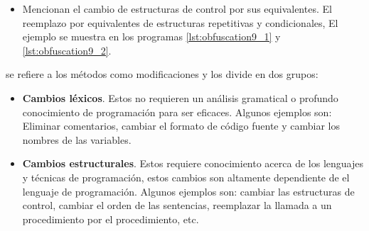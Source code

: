 \begin{itemize}
    \item \cite{article3} Mencionan el cambio de estructuras de control por sus equivalentes. El reemplazo por equivalentes de estructuras repetitivas y condicionales, El ejemplo se muestra en los programas \ref{lst:obfuscation9_1} y \ref{lst:obfuscation9_2}.
    
    
\end{itemize}

\cite{Bejarano2015} se refiere a los métodos como modificaciones y los divide en dos grupos:
\begin{itemize}
  \item \textbf{Cambios léxicos}. Estos no requieren un análisis gramatical o profundo conocimiento de programación para ser eficaces. Algunos ejemplos son: Eliminar comentarios, cambiar el formato de código fuente y cambiar los nombres de las variables.
  \item \textbf{Cambios estructurales}. Estos requiere conocimiento acerca de los lenguajes y técnicas de programación, estos cambios son altamente dependiente de el lenguaje de programación. Algunos ejemplos son: cambiar las estructuras de control, cambiar el orden de las sentencias, reemplazar la llamada a un procedimiento por el procedimiento, etc.
\end{itemize}

